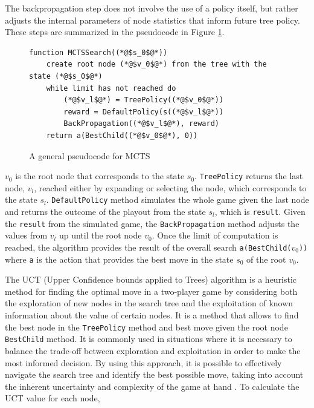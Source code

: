 The backpropagation step does not involve the use of a policy itself, but rather adjusts the internal parameters of node statistics that inform future tree policy. These steps are summarized in the pseudocode in Figure \ref{fig:mctsGeneral}.


\begin{figure}[h]
\captionsetup{justification=centering}
\begin{lstlisting}
function MCTSSearch((*@$s_0$@*))
    create root node (*@$v_0$@*) from the tree with the state (*@$s_0$@*)
    while limit has not reached do
        (*@$v_l$@*) = TreePolicy((*@$v_0$@*))
        reward = DefaultPolicy(s((*@$v_l$@*))
        BackPropagation((*@$v_l$@*), reward)
    return a(BestChild((*@$v_0$@*), 0))
\end{lstlisting}
\caption{A general pseudocode for MCTS}
\label{fig:mctsGeneral}
\end{figure}

$v_0$ is the root node that corresponds to the state $s_0$. \texttt{TreePolicy} returns the last node, $v_l$, reached either by expanding or selecting the node, which corresponds to the state $s_l$. \texttt{DefaultPolicy} method simulates the whole game given the last node and returns the outcome of the playout from the state $s_l$, which is \texttt{result}. Given the \texttt{result} from the simulated game, the \texttt{BackPropagation} method adjusts the values from $v_l$ up until the root node $v_0$. Once the limit of computation is reached, the algorithm provides the result of the overall search \texttt{a(BestChild($v_0$))} where \texttt{a} is the action that provides the best move in the state $s_0$ of the root $v_0$.

The UCT (Upper Confidence bounds applied to Trees) algorithm is a heuristic method for finding the optimal move in a two-player game by considering both the exploration of new nodes in the search tree and the exploitation of known information about the value of certain nodes. It is a method that allows to find the best node in the \texttt{TreePolicy} method and best move given the root node \texttt{BestChild} method. It is commonly used in situations where it is necessary to balance the trade-off between exploration and exploitation in order to make the most informed decision. By using this approach, it is possible to effectively navigate the search tree and identify the best possible move, taking into account the inherent uncertainty and complexity of the game at hand \citep{MCTSSurvey}. To calculate the UCT value for each node, 

